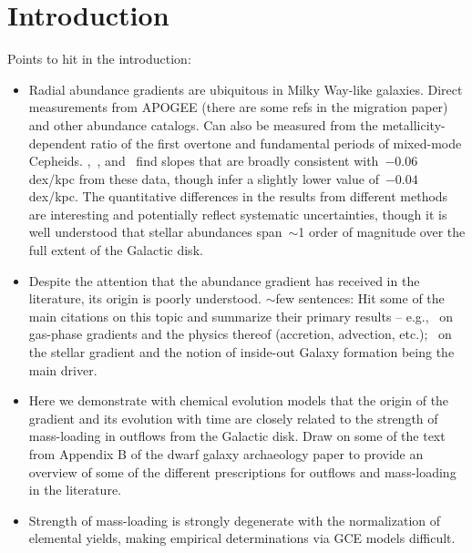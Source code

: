 \section{Introduction}
\label{outflows:sec:intro}
\noindent
Points to hit in the introduction:
\begin{itemize}

	\item Radial abundance gradients are ubiquitous in Milky Way-like galaxies.
	Direct measurements from APOGEE (there are some refs in the migration
	paper) and other abundance catalogs.
	Can also be measured from the metallicity-dependent ratio of the first
	overtone and fundamental periods of mixed-mode Cepheids.
	\citet{Luck2011a},~\citet{Luck2011b}, and~\citet{Genovali2014} find slopes
	that are broadly consistent with~$-0.06$ dex/kpc from these data, though
	\citet{Lemasle2018} infer a slightly lower value of~$-0.04$ dex/kpc.
	The quantitative differences in the results from different methods are
	interesting and potentially reflect systematic uncertainties, though it is
	well understood that stellar abundances span~$\sim$1 order of magnitude
	over the full extent of the Galactic disk.

	\item Despite the attention that the abundance gradient has received in the
	literature, its origin is poorly understood.
	{\color{red} $\sim$few sentences:} Hit some of the main citations on this
	topic and summarize their primary results -- e.g.,~\citet{Sharda2021a,
	Sharda2021b} on gas-phase gradients and the physics thereof (accretion,
	advection, etc.);~\citet{Minchev2013, Minchev2014} on the stellar gradient
	and the notion of inside-out Galaxy formation being the main driver.

	\item Here we demonstrate with chemical evolution models that the origin
	of the gradient and its evolution with time are closely related to the
	strength of mass-loading in outflows from the Galactic disk.
	Draw on some of the text from Appendix B of the dwarf galaxy archaeology
	paper to provide an overview of some of the different prescriptions for
	outflows and mass-loading in the literature.

	\item Strength of mass-loading is strongly degenerate with the
	normalization of elemental yields, making empirical determinations via
	GCE models difficult.

\end{itemize}

